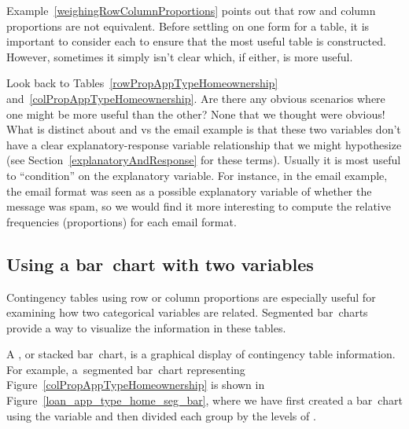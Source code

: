 Example~\ref{weighingRowColumnProportions} points out
that row and column proportions are not equivalent.
Before settling on one form for a table,
it is important to consider each to ensure that the
most useful table is constructed.
However, sometimes it simply isn't clear which, if either,
is more useful.

\newpage
\begin{examplewrap}
\begin{nexample}{Look back to
    Tables~\ref{rowPropAppTypeHomeownership}
    and~\ref{colPropAppTypeHomeownership}.
    Are there any obvious scenarios where one might be more
    useful than the other?}
  None that we thought were obvious!
  What is distinct about 
  and  vs the email example is that
  these two variables don't have a clear explanatory-response
  variable relationship that we might hypothesize
  (see Section~\ref{explanatoryAndResponse} for these terms).
  Usually it is most useful to ``condition'' on the
  explanatory variable.
  For instance, in the email example, the email format
  was seen as a possible explanatory variable of whether
  the message was spam, so we would find it more interesting
  to compute the relative frequencies (proportions)
  for each email format.
\end{nexample}
\end{examplewrap}




\subsection{Using a bar~chart with two variables}
\label{bar_plots_subsection}

Contingency tables using row or column proportions
are especially useful for examining how two categorical
variables are related.
Segmented bar~charts provide a way to visualize
the information in these tables.

A , or stacked bar~chart,
is a graphical display of contingency table information.
For example, a~segmented bar~chart representing
Figure~\ref{colPropAppTypeHomeownership}
is shown in Figure~\ref{loan_app_type_home_seg_bar},
where we have first created a bar~chart using the
 variable and then divided each group
by the levels of \mbox{}.

